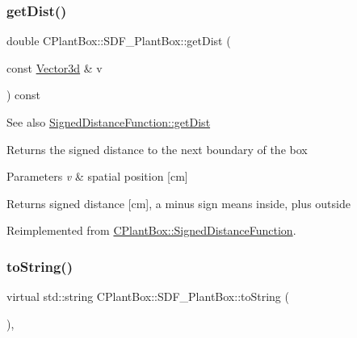 \subsubsection{\texorpdfstring{get\+Dist()}{getDist()}}
{\footnotesize\ttfamily double C\+Plant\+Box\+::\+S\+D\+F\+\_\+\+Plant\+Box\+::get\+Dist (\begin{DoxyParamCaption}\item[{const \hyperlink{classCPlantBox_1_1Vector3d}{Vector3d} \&}]{v }\end{DoxyParamCaption}) const\hspace{0.3cm}{\ttfamily [virtual]}}

\begin{DoxySeeAlso}{See also}
\hyperlink{classCPlantBox_1_1SignedDistanceFunction_a8e58237574af3673906bba84d5d14ee8}{Signed\+Distance\+Function\+::get\+Dist}
\end{DoxySeeAlso}
Returns the signed distance to the next boundary of the box


\begin{DoxyParams}{Parameters}
{\em v} & spatial position \mbox{[}cm\mbox{]} \\
\hline
\end{DoxyParams}
\begin{DoxyReturn}{Returns}
signed distance \mbox{[}cm\mbox{]}, a minus sign means inside, plus outside 
\end{DoxyReturn}


Reimplemented from \hyperlink{classCPlantBox_1_1SignedDistanceFunction_a8e58237574af3673906bba84d5d14ee8}{C\+Plant\+Box\+::\+Signed\+Distance\+Function}.

\mbox{\label{classCPlantBox_1_1SDF__PlantBox_af7c53cdbb174e253799444c00503b354}} 
\subsubsection{\texorpdfstring{to\+String()}{toString()}}
{\footnotesize\ttfamily virtual std\+::string C\+Plant\+Box\+::\+S\+D\+F\+\_\+\+Plant\+Box\+::to\+String (\begin{DoxyParamCaption}{ }\end{DoxyParamCaption})\hspace{0.3cm}{\ttfamily [inline]}, {\ttfamily [virtual]}}

